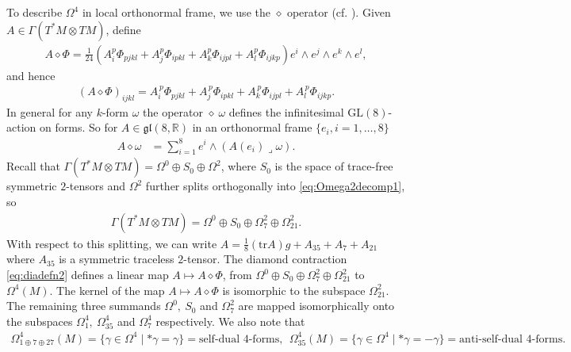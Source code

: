 \documentclass[10pt,a4paper,reqno]{article}
\theoremstyle{definition}
\numberwithin{equation}{section}
\def\bR{\mathbb R}
\newcommand{\tr}{\mathrm{tr}}
\def\s7{\Phi}
\begin{document}
\noindent
To describe $\Omega^4$ in local orthonormal frame, we use the $\diamond$ operator (cf. \cite{dgk-isometric, dle-isometric, Spin7-flow_Dwivedi}). Given $A\in \Gamma(T^*M\otimes TM)$, define
\begin{align}
\label{eq:diadefn1}
    A\diamond \s7= \frac{1}{24}(A_{i}^p\s7_{pjkl}+A_{j}^p\s7_{ipkl}+A_{k}^p\s7_{ijpl}+A_{l}^p\s7_{ijkp})e^i\wedge e^j\wedge e^k\wedge e^l,    
\end{align}
and hence 
\begin{align}
\label{eq:diadefn2}
    (A\diamond \s7)_{ijkl}=  A_{i}^{\, p}\s7_{pjkl}+A_{j}^{\, p}\s7_{ipkl}+A_{k}^{\, p}\s7_{ijpl}+A_{l}^{\, p}\s7_{ijkp}. 
\end{align}
In general for any $k$-form $\omega$ the operator $\diamond \ \omega$ defines the infinitesimal $\mathrm{GL}(8)$-action on forms. So for $A\in \mathfrak{gl}(8,\bR)$ in an orthonormal frame $\{e_i,i=1,\ldots,8\}$ 
\begin{align}\label{eqn:gen_diamond}
    A \diamond \omega &= \sum_{i=1}^8 e^i\wedge (A(e_i)\lrcorner \omega).
\end{align}
Recall that $
    \Gamma(T^*M\otimes TM)=\Omega^0\oplus S_0\oplus \Omega^2$, where $S_0$ is the space of trace-free symmetric $2$-tensors and $\Omega^2$ further splits orthogonally into \cref{eq:Omega2decomp1}, so
\begin{align}
\label{eq:splitting TM* x TM}
 \Gamma(T^*M\otimes TM)=\Omega^0\oplus S_0 \oplus \Omega^2_7\oplus \Omega^2_{21}.   
\end{align}
With respect to this splitting, we can write $A=\frac 18 (\tr A)g+A_{35}+A_7+A_{21}$ where $A_{35}$ is a symmetric traceless $2$-tensor. 
The diamond contraction \cref{eq:diadefn2} defines a linear map $A\mapsto A\diamond \s7$, from $\Omega^0\oplus S_0 \oplus \Omega^2_7\oplus \Omega^2_{21}$ to $\Omega^4(M)$. The kernel of the map $A\mapsto A\diamond \s7$ is isomorphic to the subspace $\Omega^2_{21}$. The remaining three summands $\Omega^0,\ S_0$ and $\Omega^2_7$ are mapped isomorphically onto the subspaces $\Omega^4_1,\ \Omega^4_{35}$ and $\Omega^4_7$ respectively. We also note that 
\begin{align}\label{eq:sdasdforms}
\Omega^4_{1\oplus7\oplus 27}(M) = \{\gamma \in \Omega^4 \mid *\gamma = \gamma\} = \text{self-dual\ }4\text{-forms},\ \ \Omega^4_{35}(M)=\{\gamma \in \Omega^4 \mid *\gamma =- \gamma\} = \text{anti-self-dual\ }4\text{-forms}.
\end{align}


\medskip
\end{document}
